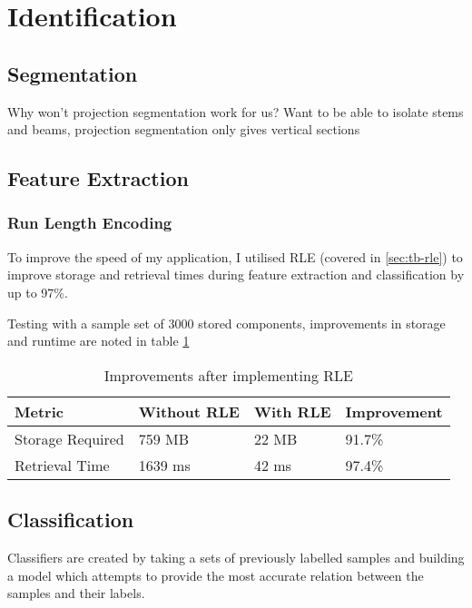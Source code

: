 \section{Identification}

\subsection{Segmentation}

Why won't projection segmentation work for us? Want to be able to isolate stems and beams, projection segmentation only gives vertical sections


\subsection{Feature Extraction}

\subsubsection{Run Length Encoding}
To improve the speed of my application, I utilised \acrfull{RLE} (covered in \cref{sec:tb-rle}) to improve storage and retrieval times during feature extraction and classification by up to 97\%.

Testing with a sample set of 3000 stored components, improvements in storage and runtime are noted in table \cref{table:rle-improvement}

\begin{table}[h]

    \begin{tabularx}{\textwidth}{ X X X X }
    \toprule
    Metric                  & Without RLE   & With RLE   & Improvement \\
    \midrule
    Storage Required        & 759 MB        & 22 MB      & 91.7\%      \\
    Retrieval Time          & 1639 ms       & 42 ms      & 97.4\% \\
    \bottomrule
    \end{tabularx}

    \label{table:rle-improvement}
    \caption{Improvements after implementing RLE}
\end{table}

\subsection{Classification}
\label{sec:implementation-classification}

Classifiers are created by taking a sets of previously labelled samples and building a model which attempts to provide the most accurate relation between the samples and their labels.

